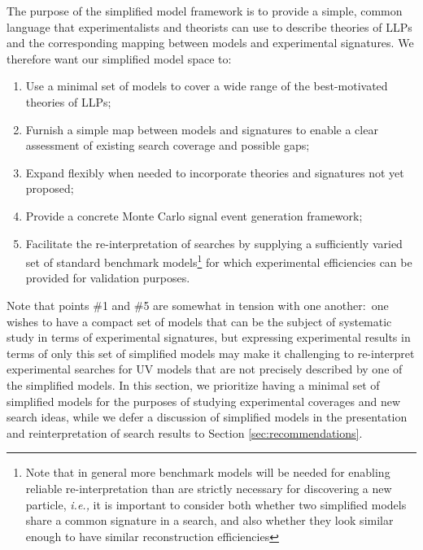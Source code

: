 The purpose of the simplified model framework is to provide a simple, common language that experimentalists and theorists can use to describe theories of LLPs and the corresponding mapping between models and experimental signatures. We therefore want our simplified model space to:
%
\begin{enumerate}
%
\item  Use a minimal set of models to cover a wide range of the best-motivated theories of LLPs;
\item  Furnish a simple map between models and signatures to enable a clear assessment of existing search coverage and possible gaps; %
\item Expand flexibly when needed to incorporate theories and signatures not yet proposed;
\item Provide a concrete Monte Carlo signal event generation framework;
\item Facilitate the re-interpretation of searches by supplying a sufficiently varied set of standard benchmark models\footnote{Note that  in general more benchmark models will be needed for enabling reliable re-interpretation than are strictly necessary for discovering a new particle, \emph{i.e.,}  it is important to consider both whether two simplified models share a common signature in a search, and also whether they look similar enough to have similar reconstruction efficiencies} for which experimental efficiencies can be provided for validation purposes.
\end{enumerate}
%
Note that points \#1 and \#5 are somewhat in tension with one another:~one wishes to have a compact set of models that can be the subject of systematic study in terms of experimental signatures, but expressing experimental results in terms of only this set of simplified models may make it challenging to re-interpret experimental searches for UV models that are not precisely described by one of the simplified models. In this section, we prioritize having a minimal set of simplified models for the purposes of studying experimental coverages and new search ideas, while we defer a discussion of simplified models in the presentation and reinterpretation of search results to Section \ref{sec:recommendations}.


